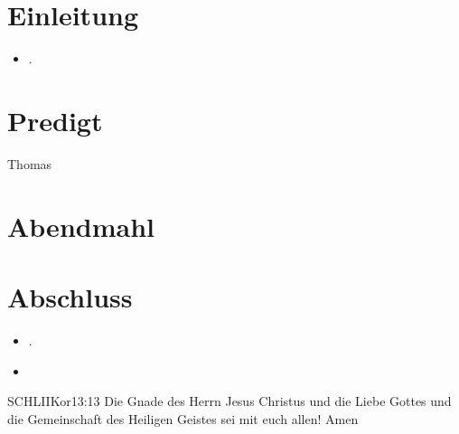 \documentclass[fontsize=14pt]{mybib}
\newcommand{\Name}{Thomas}
\begin{document}
\section{Einleitung}
  

\begin{itemize}
    \item {}.
\end{itemize}
\section{Predigt}
    \Name
\section{Abendmahl}

\section{Abschluss}
\begin{itemize}
    \item {}.
    \item {}
\end{itemize}
\begin{bibelbox}{SCHL}{IIKor}{13:13}
    Die Gnade des Herrn Jesus Christus und die Liebe Gottes und die Gemeinschaft des Heiligen Geistes sei mit euch allen! Amen
\end{bibelbox}
\end{document}
